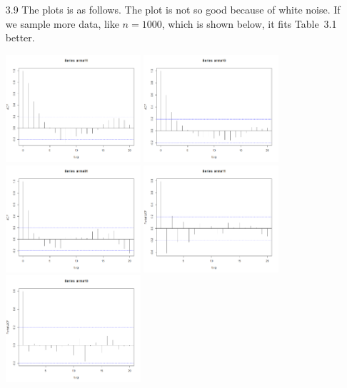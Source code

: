 \documentclass{article}
\begin{document}
\begin{CJK*}{GBK}{song}
\begin{enumerate}
\item[3.9]
The plots is as follows. The plot is not so good because of white noise. If we sample more data, like $n=1000$, which is shown below, it fits Table~3.1 better.
\begin{center}
\includegraphics[width=5cm]{1.png}
\includegraphics[width=5cm]{2.png}
\includegraphics[width=5cm]{3.png}
\includegraphics[width=5cm]{4.png}
\includegraphics[width=5cm]{5.png}

\end{center}
\end{enumerate}
\end{CJK*}
\end{document}
